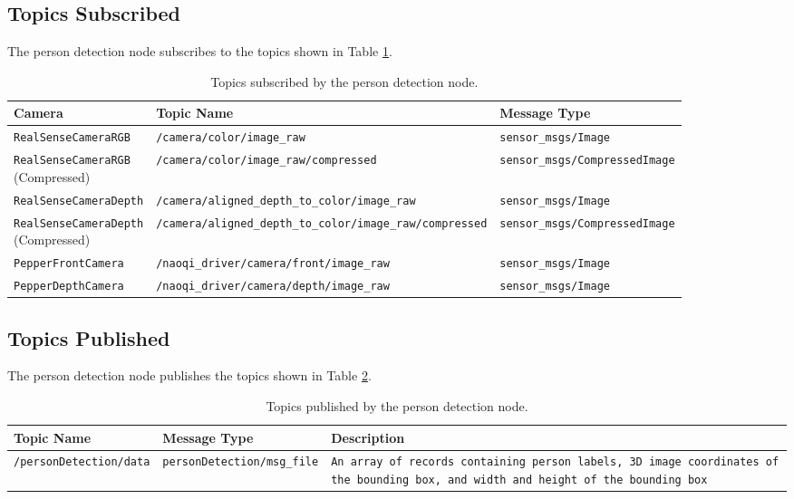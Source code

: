 \documentclass{CSSRforAfrica}
\begin{document}
\subsection*{Topics Subscribed}
The person detection node subscribes to the  topics shown in Table \ref{tab:topics_subscribed}.
\begin{table}[!h]
	\centering
	{\fontsize{7.0}{9.0}\selectfont %
		\begin{tabularx}{\linewidth}{| l | l | X |}
			\hline
			\rowcolor{blue!20}
			\textbf{Camera} & \textbf{Topic Name} & \textbf{Message Type} \\
			\hline
			\texttt{RealSenseCameraRGB} & \texttt{/camera/color/image\_raw} & \texttt{sensor\_msgs/Image} \\
			\hline
			\makecell[l]{\texttt{RealSenseCameraRGB} \\ (Compressed)} & \texttt{/camera/color/image\_raw/compressed} & \texttt{sensor\_msgs/CompressedImage} \\
			\hline
			\texttt{RealSenseCameraDepth} & \texttt{/camera/aligned\_depth\_to\_color/image\_raw} & \texttt{sensor\_msgs/Image} \\
			\hline
			\makecell[l]{\texttt{RealSenseCameraDepth} \\ (Compressed)} & \texttt{/camera/aligned\_depth\_to\_color/image\_raw/compressed} & \texttt{sensor\_msgs/CompressedImage} \\
			\hline
			\texttt{PepperFrontCamera} & \texttt{/naoqi\_driver/camera/front/image\_raw} & \texttt{sensor\_msgs/Image} \\
			\hline
			\texttt{PepperDepthCamera} & \texttt{/naoqi\_driver/camera/depth/image\_raw} & \texttt{sensor\_msgs/Image} \\
			\hline
		\end{tabularx}
	}
	\caption{Topics subscribed by the person detection node.}
\label{tab:topics_subscribed}
\end{table}

\newpage

\subsection*{Topics Published}
The person detection node publishes the  topics shown in Table \ref{tab:topics_published}.
\begin{table}[!h]
	\centering
	\begin{tabularx}{\linewidth}{| l | l | X |}
		\hline
		\rowcolor{blue!20} %
		\textbf{Topic Name} & \textbf{Message Type} & \textbf{Description} \\
		\hline
		{\footnotesize \texttt{/personDetection/data} }  & {\footnotesize \texttt{personDetection/msg\_file}} & {\footnotesize \texttt{An array of records containing person labels, 3D image coordinates of the bounding box, and width and height of the bounding box}} \\
		\hline
	\end{tabularx}
	\caption{Topics published by the person detection node.}
\label{tab:topics_published}
\end{table}
\end{document}
